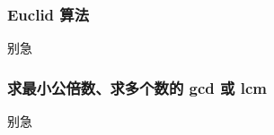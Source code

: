 \subsubsection{Euclid 算法}
\begin{frame}[c]
  \progressnow
\end{frame}
\begin{frame}{别急}\end{frame} %
\subsubsection{求最小公倍数、求多个数的 gcd 或 lcm}
\begin{frame}[c]
  \progressnow
\end{frame}
\begin{frame}{别急}\end{frame} %
